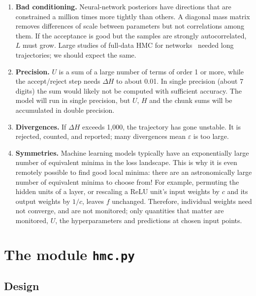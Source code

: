 \documentclass[11pt]{article}
\begin{document}
\begin{watch}
\begin{enumerate}
  \item \textbf{Bad conditioning.} Neural-network posteriors have directions that are
    constrained a million times more tightly than others. A diagonal mass matrix
    removes differences of scale between parameters but not correlations among them.
    If the acceptance is good but the samples are strongly autocorrelated, $L$ must
    grow. Large studies of full-data HMC for networks~\cite{izmailov2021} needed long
    trajectories; we should expect the same.
  \item \textbf{Precision.} $U$ is a sum of a large number of terms of order 1 or more, while the
    accept/reject step needs $\Delta H$ to about 0.01. In single precision (about 7
    digits) the sum would likely not be computed with sufficient accuracy. The model will run in single
    precision, but $U$, $H$ and the chunk sums will be accumulated in double precision.
  \item \textbf{Divergences.} If $\Delta H$ exceeds 1,000, the trajectory has gone
    unstable. It is rejected, counted,
    and reported; many divergences mean $\varepsilon$ is too large.
  \item \textbf{Symmetries.} Machine learning models typically have an exponentially large number of equivalent minima in the loss landscape. This is why it is even remotely possible to find good local minima: there are an astronomically large number of equivalent minima to choose from! For example, permuting the hidden units of a layer, or rescaling a
    ReLU unit's input weights by $c$ and its output weights by $1/c$, leaves $f$
    unchanged. Therefore, individual weights need not converge, and are not
    monitored; only quantities that matter are monitored, $U$, the hyperparameters and predictions
    at chosen input points.
\end{enumerate}
\end{watch}

\section{The module \texttt{hmc.py}}
\label{sec:module}

\subsection{Design}
\end{document}
